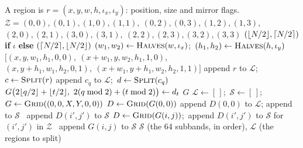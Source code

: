 \begin{algorithm}[ht]
  \caption{Subband geometry for an $X \times Y$ image.}
  \label{alg:tree}
  \begin{algorithmic}[1]
    \Statex A region is $r = (x, y, w, h, \iota_x, \iota_y)$: position, size and mirror flags.
    \Statex $\mathcal{Z} = (0,0),(0,1),(1,0),(1,1),\ (0,2),(0,3),(1,2),(1,3),$
    \Statex {}$(2,0),(2,1),(3,0),(3,1),\ (2,2),(2,3),(3,2),(3,3)$ 
     
      \State \Return $(\lfloor N/2 \rfloor, \lceil N/2 \rceil)$ \textbf{if} $\iota$ \textbf{else} $(\lceil N/2 \rceil, \lfloor N/2 \rfloor)$
    \EndFunction
     
      \State $(w_1, w_2) \gets \Call{Halves}{w, \iota_x}$;\ $(h_1, h_2) \gets \Call{Halves}{h, \iota_y}$
      \State \Return $\bigl[(x, y, w_1, h_1, 0, 0),\ (x{+}w_1, y, w_2, h_1, 1, 0),$
      \Statex \hspace{\algorithmicindent}\hspace{\algorithmicindent}\hphantom{\textbf{return} $\bigl[$}$(x, y{+}h_1, w_1, h_2, 0, 1),\ (x{+}w_1, y{+}h_1, w_2, h_2, 1, 1)\bigr]$
    \EndFunction
     
      \State append $r$ to $\mathcal{L}$;\ $c \gets \Call{Split}{r}$
        \State append $c_q$ to $\mathcal{L}$;\ $d \gets \Call{Split}{c_q}$
          \State $G\bigl(2\lfloor q/2 \rfloor + \lfloor t/2 \rfloor,\ 2(q \bmod 2) + (t \bmod 2)\bigr) \gets d_t$
        \EndFor
      \EndFor
      \State \Return $G$ 
    \EndFunction
      \State $\mathcal{L} \gets [\,]$;\ $\mathcal{S} \gets [\,]$;\ $G \gets \Call{Grid}{(0, 0, X, Y, 0, 0)}$
          \State $D \gets \Call{Grid}{G(0,0)}$
             append $D(0,0)$ to $\mathcal{L}$; append  to $\mathcal{S}$
            \Else\ append $D(i',j')$ to $\mathcal{S}$
            \EndIf
          \EndFor
          \State $D \gets \Call{Grid}{G(i,j)}$;\ append $D(i',j')$ to $\mathcal{S}$ for $(i',j')$ in $\mathcal{Z}$
        \Else\ append $G(i,j)$ to $\mathcal{S}$
        \EndIf
      \EndFor
      \State \Return $\mathcal{S}$ (the 64 subbands, in order), $\mathcal{L}$ (the regions to split)
    \EndFunction
  \end{algorithmic}
\end{algorithm}

